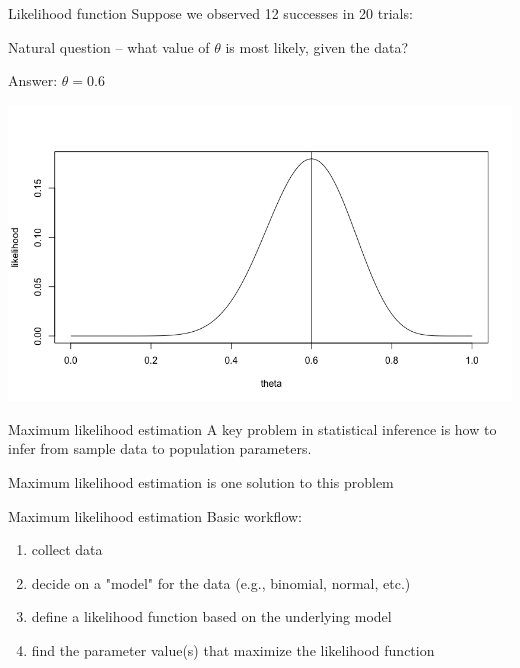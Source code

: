 \documentclass[presentation]{beamer}
\begin{document}
\begin{frame}[label=sec-7]{Likelihood function}
Suppose we observed 12 successes in 20 trials:

\vspace{1cm}

Natural question -- what value of $\theta$ is \alert{most likely}, given the data?

Answer: $\theta=0.6$

\includegraphics[width=.9\linewidth]{figures/week2/maxLikelihood.png}
\end{frame}

\begin{frame}[label=sec-8]{Maximum likelihood estimation}
A key problem in statistical inference is how to infer from \alert{sample data} to \alert{population parameters}.

\vspace{1cm}

Maximum likelihood estimation is one solution to this problem
\end{frame}

\begin{frame}[label=sec-9]{Maximum likelihood estimation}
Basic workflow:
\begin{enumerate}
\item collect data
\item decide on a "model" for the data (e.g., binomial, normal, etc.)
\item define a likelihood function based on the underlying model
\item find the parameter value(s) that \alert{maximize} the likelihood function
\end{enumerate}
\end{frame}
\end{document}
